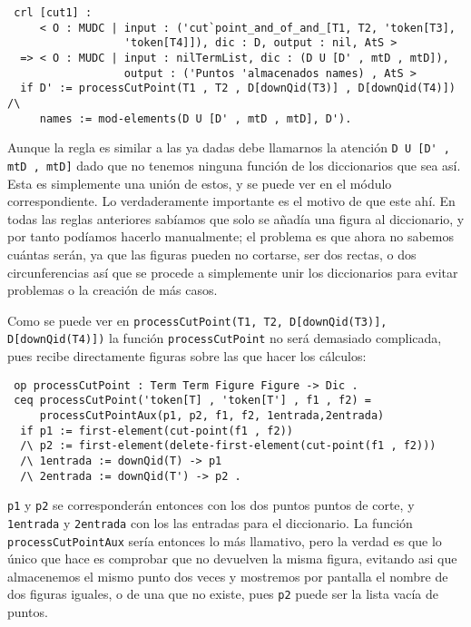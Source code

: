 {\codesize
\begin{verbatim}
 crl [cut1] :
     < O : MUDC | input : ('cut`point_and_of_and_[T1, T2, 'token[T3],
                  'token[T4]]), dic : D, output : nil, AtS >
  => < O : MUDC | input : nilTermList, dic : (D U [D' , mtD , mtD]),
                  output : ('Puntos 'almacenados names) , AtS >
  if D' := processCutPoint(T1 , T2 , D[downQid(T3)] , D[downQid(T4)]) /\
     names := mod-elements(D U [D' , mtD , mtD], D').
\end{verbatim}
}

Aunque la regla es similar a las ya dadas debe llamarnos la atención \verb"D U [D' , mtD , mtD]" dado que no tenemos ninguna función de los diccionarios que sea así. Esta es simplemente una unión de estos, y se puede ver en el módulo correspondiente. Lo verdaderamente importante es el motivo de que este ahí. En todas las reglas anteriores sabíamos que solo se añadía una figura al diccionario, y por tanto podíamos hacerlo manualmente; el problema es que ahora no sabemos cuántas serán, ya que las figuras pueden no cortarse, ser dos rectas, o dos circunferencias así que se procede a simplemente unir los diccionarios para evitar problemas o la creación de más casos.

Como se puede ver en \verb"processCutPoint(T1, T2, D[downQid(T3)], D[downQid(T4)])" la función \texttt{processCutPoint} no será demasiado complicada, pues recibe directamente figuras sobre las que hacer los cálculos: \par

{\codesize
\begin{verbatim}
 op processCutPoint : Term Term Figure Figure -> Dic .
 ceq processCutPoint('token[T] , 'token[T'] , f1 , f2) =
     processCutPointAux(p1, p2, f1, f2, 1entrada,2entrada)
  if p1 := first-element(cut-point(f1 , f2))
  /\ p2 := first-element(delete-first-element(cut-point(f1 , f2)))
  /\ 1entrada := downQid(T) -> p1
  /\ 2entrada := downQid(T') -> p2 .
\end{verbatim}
}

\texttt{p1} y \texttt{p2} se corresponderán entonces con los dos puntos puntos de corte, y \texttt{1entrada} y \texttt{2entrada} con los las entradas para el diccionario. La función \texttt{processCutPointAux} sería entonces lo más llamativo, pero la verdad es que lo único que hace es comprobar que no devuelven la misma figura, evitando asi que almacenemos el mismo punto dos veces y mostremos por pantalla el nombre de dos figuras iguales, o de una que no existe, pues \texttt{p2} puede ser la lista vacía de puntos. \par

